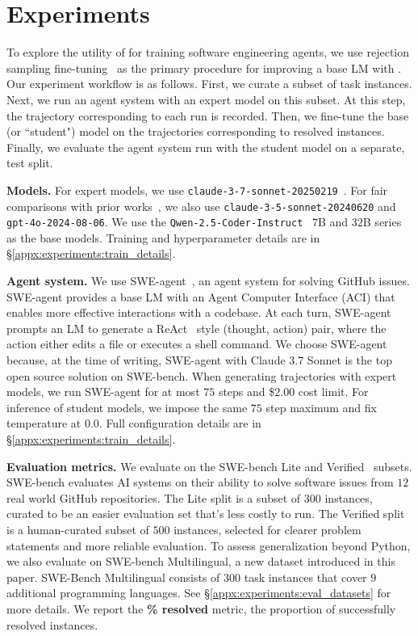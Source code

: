 \section{Experiments}
\label{sec:experiments}
To explore the utility of \bugs{} for training software engineering agents, we use rejection sampling fine-tuning~\citep{yuan2023scalingrelationshiplearningmathematical} as the primary procedure for improving a base LM with \bugs{}.
Our experiment workflow is as follows.
First, we curate a subset of \bugs{} task instances.
Next, we run an agent system with an expert model on this subset.
At this step, the trajectory corresponding to each run is recorded.
Then, we fine-tune the base (or ``student") model on the trajectories corresponding to resolved instances.
Finally, we evaluate the agent system run with the student model on a separate, test split.

\textbf{Models.} For expert models, we use \texttt{claude-3-7-sonnet-20250219}~\citep{anthropicclaude37}.
For fair comparisons with prior works~\citep{pan_training_2024}, we also use \texttt{claude-3-5-sonnet-20240620} and \texttt{gpt-4o-2024-08-06}.
We use the \texttt{Qwen-2.5-Coder-Instruct}~\citep{hui2024qwen25codertechnicalreport} $7$B and $32$B series as the base models.
Training and hyperparameter details are in \S\ref{appx:experiments:train_details}.

\textbf{Agent system.} We use SWE-agent~\citep{yang_swe-agent_2024}, an agent system for solving GitHub issues.
SWE-agent provides a base LM with an Agent Computer Interface (ACI) that enables more effective interactions with a codebase.
At each turn, SWE-agent prompts an LM to generate a ReAct~\citep{yao_react_2023} style (thought, action) pair, where the action either edits a file or executes a shell command.
We choose SWE-agent because, at the time of writing, SWE-agent with Claude 3.7 Sonnet is the top open source solution on SWE-bench.
When generating trajectories with expert models, we run SWE-agent for at most $75$ steps and \$$2.00$ cost limit.
For inference of student models, we impose the same $75$ step maximum and fix temperature at $0.0$.
Full configuration details are in \S\ref{appx:experiments:train_details}.

\textbf{Evaluation metrics.}
We evaluate on the SWE-bench Lite and Verified~\citep{chowdhuryintroducing} subsets.
SWE-bench evaluates AI systems on their ability to solve software issues from $12$ real world GitHub repositories.
The Lite split is a subset of $300$ instances, curated to be an easier evaluation set that's less costly to run.
The Verified split is a human-curated subset of $500$ instances, selected for clearer problem statements and more reliable evaluation.
To assess generalization beyond Python, we also evaluate on SWE-bench Multilingual, a new dataset introduced in this paper.
SWE-Bench Multilingual consists of $300$ task instances that cover $9$ additional programming languages.
See \S\ref{appx:experiments:eval_datasets} for more details.
We report the \textbf{\% resolved} metric, the proportion of successfully resolved instances.